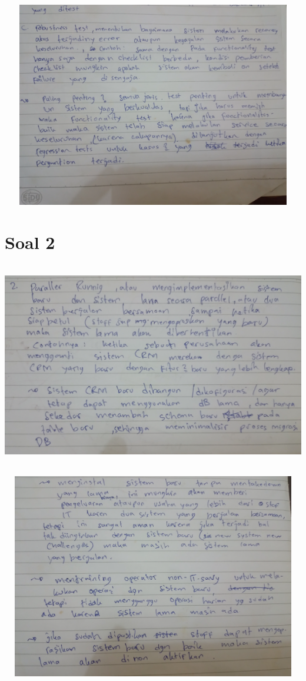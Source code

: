 \documentclass[12pt]{article}
\begin{document}
\begin{center}
   \includegraphics[width=17cm, height=9cm]{images/part-3.jpg}
\end{center}


\section*{Soal 2}

\begin{center}
   \includegraphics[width=17cm, height=9cm]{images/part-4.jpg}
\end{center}
\begin{center}
   \includegraphics[width=17cm, height=9cm]{images/part-5.jpg}
\end{center}
\end{document}
